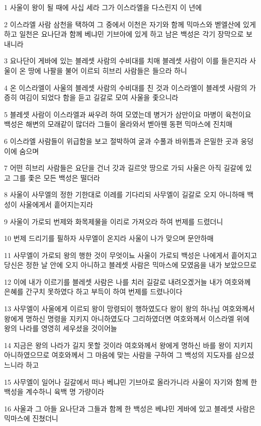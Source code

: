 \par 1 사울이 왕이 될 때에 사십 세라 그가 이스라엘을 다스린지 이 년에
\par 2 이스라엘 사람 삼천을 택하여 그 중에서 이천은 자기와 함께 믹마스와 벧엘산에 있게 하고 일천은 요나단과 함께 베냐민 기브아에 있게 하고 남은 백성은 각기 장막으로 보내니라
\par 3 요나단이 게바에 있는 블레셋 사람의 수비대를 치매 블레셋 사람이 이를 들은지라 사울이 온 땅에 나팔을 불어 이르되 히브리 사람들은 들으라 하니
\par 4 온 이스라엘이 사울의 블레셋 사람의 수비대를 친 것과 이스라엘이 블레셋 사람의 가증히 여김이 되었다 함을 듣고 길갈로 모여 사울을 좇으니라
\par 5 블레셋 사람이 이스라엘과 싸우려 하여 모였는데 병거가 삼만이요 마병이 육천이요 백성은 해변의 모래같이 많더라 그들이 올라와서 벧아웬 동편 믹마스에 진치매
\par 6 이스라엘 사람들이 위급함을 보고 절박하여 굴과 수풀과 바위틈과 은밀한 곳과 웅덩이에 숨으며
\par 7 어떤 히브리 사람들은 요단을 건너 갓과 길르앗 땅으로 가되 사울은 아직 길갈에 있고 그를 좇은 모든 백성은 떨더라
\par 8 사울이 사무엘의 정한 기한대로 이레를 기다리되 사무엘이 길갈로 오지 아니하매 백성이 사울에게서 흩어지는지라
\par 9 사울이 가로되 번제와 화목제물을 이리로 가져오라 하여 번제를 드렸더니
\par 10 번제 드리기를 필하자 사무엘이 온지라 사울이 나가 맞으며 문안하매
\par 11 사무엘이 가로되 왕의 행한 것이 무엇이뇨 사울이 가로되 백성은 나에게서 흩어지고 당신은 정한 날 안에 오지 아니하고 블레셋 사람은 믹마스에 모였음을 내가 보았으므로
\par 12 이에 내가 이르기를 블레셋 사람은 나를 치러 길갈로 내려오겠거늘 내가 여호와께 은혜를 간구치 못하였다 하고 부득이 하여 번제를 드렸나이다
\par 13 사무엘이 사울에게 이르되 왕이 망령되이 행하였도다 왕이 왕의 하나님 여호와께서 왕에게 명하신 명령을 지키지 아니하였도다 그리하였더면 여호와께서 이스라엘 위에 왕의 나라를 영영히 세우셨을 것이어늘
\par 14 지금은 왕의 나라가 길지 못할 것이라 여호와께서 왕에게 명하신 바를 왕이 지키지 아니하였으므로 여호와께서 그 마음에 맞는 사람을 구하여 그 백성의 지도자를 삼으셨느니라 하고
\par 15 사무엘이 일어나 길갈에서 떠나 베냐민 기브아로 올라가니라 사울이 자기와 함께 한 백성을 계수하니 육백 명 가량이라
\par 16 사울과 그 아들 요나단과 그들과 함께 한 백성은 베냐민 게바에 있고 블레셋 사람은 믹마스에 진쳤더니
